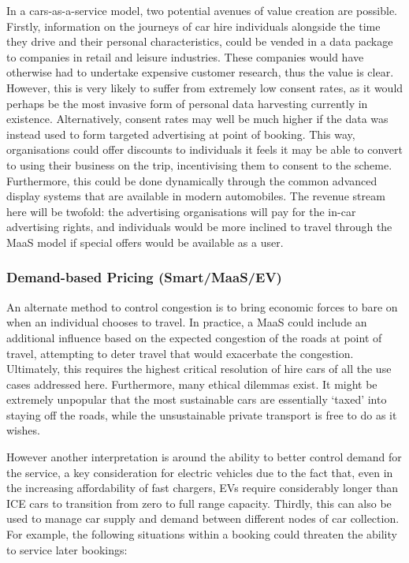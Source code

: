 \documentclass[journal]{IEEEtran}
\begin{document}
In a cars-as-a-service model, two potential avenues of value creation
are possible. Firstly, information on the journeys of car hire
individuals alongside the time they drive and their personal
characteristics, could be vended in a data package to companies in
retail and leisure industries. These companies would have otherwise
had to undertake expensive customer research, thus the value is
clear. However, this is very likely to suffer from extremely low
consent rates, as it would perhaps be the most invasive form of
personal data harvesting currently in existence. Alternatively,
consent rates may well be much higher if the data was instead used to
form targeted advertising at point of booking. This way, organisations
could offer discounts to individuals it feels it may be able to
convert to using their business on the trip, incentivising them to
consent to the scheme. Furthermore, this could be done dynamically
through the common advanced display systems that are available in
modern automobiles. The revenue stream here will be twofold: the
advertising organisations will pay for the in-car advertising rights,
and individuals would be more inclined to travel through the MaaS
model if special offers would be available as a user.


\subsubsection{Demand-based Pricing (Smart/MaaS/EV)}

An alternate method to control congestion is to bring economic forces
to bare on when an individual chooses to travel. In practice, a MaaS
could include an additional influence based on the expected congestion
of the roads at point of travel, attempting to deter travel that would
exacerbate the congestion. Ultimately, this requires the highest
critical resolution of hire cars of all the use cases addressed
here. Furthermore, many ethical dilemmas exist. It might be extremely
unpopular that the most sustainable cars are essentially `taxed' into
staying off the roads, while the unsustainable private transport is
free to do as it wishes.

However another interpretation is around the ability to better control
demand for the service, a key consideration for electric vehicles due
to the fact that, even in the increasing affordability of fast
chargers, EVs require considerably longer than ICE cars to transition
from zero to full range capacity. Thirdly, this can also be used to
manage car supply and demand between different nodes of car
collection. For example, the following situations within a booking
could threaten the ability to service later bookings:
\end{document}
